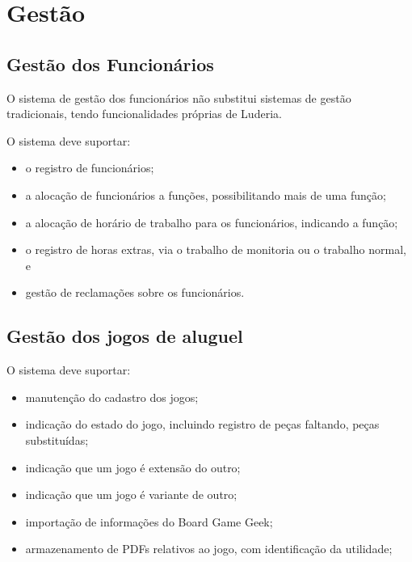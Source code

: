 \chapter{Gestão}
\label{chap:gestao}


\section{Gestão dos Funcionários}

O sistema de gestão dos funcionários não substitui sistemas de gestão tradicionais, tendo funcionalidades próprias de Luderia.


O sistema deve suportar:
\begin{itemize}
    \item o registro de funcionários;
    \item a alocação de funcionários a funções, possibilitando mais de uma função;
    \item a alocação de horário de trabalho para os funcionários, indicando a função;
    \item o registro de horas extras, via o trabalho de monitoria ou o trabalho normal, e
    \item gestão de reclamações sobre os funcionários.
\end{itemize}

\section{Gestão dos jogos de aluguel}

O sistema deve suportar:
\begin{itemize}
    \item manutenção do cadastro dos jogos;
    \item indicação do estado do jogo, incluindo registro de peças faltando, peças substituídas;
    \item indicação que um jogo é extensão do outro;
    \item indicação que um jogo é variante de outro;
    \item importação de informações do Board Game Geek;
    \item armazenamento de PDFs relativos ao jogo, com identificação da utilidade;
\end{itemize}